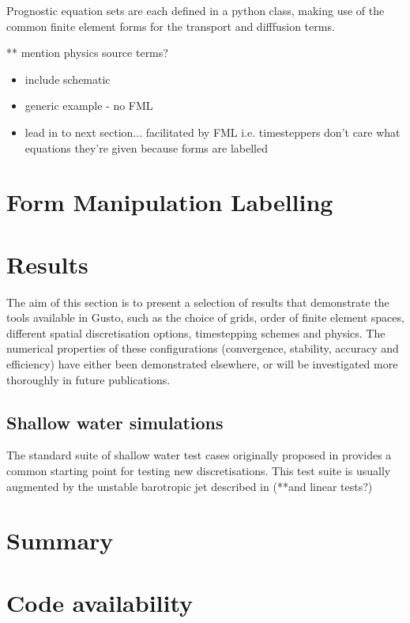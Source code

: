 \documentclass[11pt, a4paper]{article}
\begin{document}
Prognostic equation sets are each defined in a python class, making
use of the common finite element forms for the transport and
difffusion terms.

** mention physics source terms?

\begin{itemize}
\item include schematic
\item generic example - no FML
\item lead in to next section... facilitated by FML i.e. timesteppers don't care what equations they're given because forms are labelled
\end{itemize}

\section{Form Manipulation Labelling}
\label{sec: FML}

\section{Results}
\label{sec: results}
The aim of this section is to present a selection of results that
demonstrate the tools available in Gusto, such as the choice of grids,
order of finite element spaces, different spatial discretisation
options, timestepping schemes and physics. The numerical properties of
these configurations (convergence, stability, accuracy and efficiency)
have either been demonstrated elsewhere, or will be investigated more
thoroughly in future publications.

\subsection{Shallow water simulations}
The standard suite of shallow water test cases originally proposed in
\citet{williamson1992standard} provides a common starting point for
testing new discretisations. This test suite is usually augmented by
the unstable barotropic jet described in \citet{galewsky2004initial}
(**and linear tests?)





\section{Summary}
\label{sec: summary}

\section{Code availability}


\end{document}
